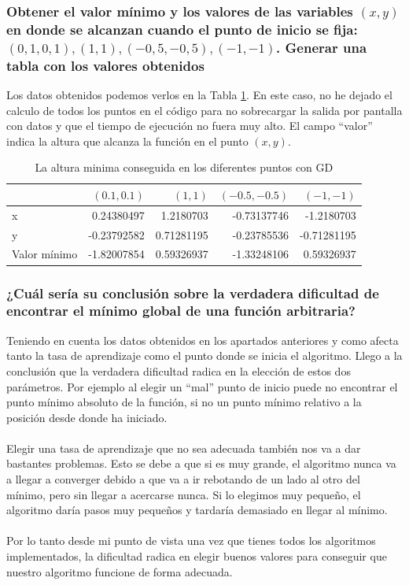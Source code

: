 \documentclass[12pt,a4paper]{article}
\begin{document}
\subsubsection{Obtener el valor mínimo y los valores de las variables \((x, y)\) en donde se alcanzan cuando el punto de inicio se fija: \((0,1, 0,1), (1, 1),(-0,5, -0,5),(-1, -1)\). Generar una tabla con los valores obtenidos}
Los datos obtenidos podemos verlos en la Tabla \ref{tab:puntos}. En este caso, no he dejado el calculo de todos los puntos en el código para no sobrecargar la salida por pantalla con datos y que el tiempo de ejecución no fuera muy alto. El campo ``valor'' indica la altura que alcanza la función en el punto \((x,y)\).
\begin{table}[H]

	\caption {La altura minima conseguida en los diferentes puntos con GD} \label{tab:puntos} 
	   
	\begin{tabular}{|l|r|r|r|r|}
		\hline
		\backslashbox{Valor final}{Punto} &  \((0.1 , 0.1)\) & \((1 , 1)\) & \((-0.5 , -0.5)\) & \((-1 , -1)\)\\
		\hline
		x & 0.24380497 & 1.2180703  & -0.73137746  & -1.2180703\\
		\hline
		y & -0.23792582 & 0.71281195 & -0.23785536 & -0.71281195\\
		\hline
		Valor mínimo & -1.82007854 & 0.59326937 & -1.33248106 & 0.59326937\\
		\hline
	\end{tabular}
\end{table}
\subsubsection{¿Cuál sería su conclusión sobre la verdadera dificultad de encontrar el mínimo	global de una función arbitraria?}
Teniendo en cuenta los datos obtenidos en los apartados anteriores y como afecta tanto la tasa de aprendizaje como el punto donde se inicia el algoritmo. Llego a la conclusión que la verdadera dificultad radica en la elección de estos dos parámetros. Por ejemplo al elegir un ``mal'' punto de inicio puede no encontrar el punto mínimo absoluto de la función, si no un punto mínimo relativo a la posición desde donde ha iniciado. \\\\
Elegir una tasa de aprendizaje que no sea adecuada también nos va a dar bastantes problemas. Esto se debe a que si es muy grande, el algoritmo nunca va a llegar a converger debido a que va a ir rebotando de un lado al otro del mínimo, pero sin llegar a acercarse nunca. Si lo elegimos muy pequeño, el algoritmo daría pasos muy pequeños y tardaría demasiado en llegar al mínimo.\\\\
Por lo tanto desde mi punto de vista una vez que tienes todos los algoritmos implementados, la dificultad radica en elegir buenos valores para conseguir que nuestro algoritmo funcione de forma adecuada.\textbf{}
\end{document}
